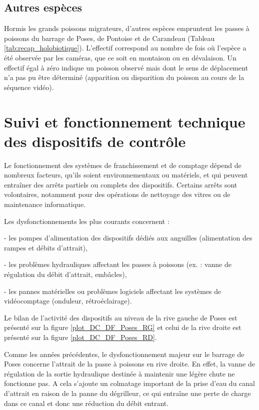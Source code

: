 \documentclass[11pt,twoside]{article}\usepackage[]{graphicx}\usepackage[table]{xcolor}
\begin{document}
\clearpage

\subsection{Autres espèces}



Hormis les grands poissons migrateurs, d'autres espèces empruntent les passes à poissons du barrage de Poses, de Pontoise et de Carandeau (Tableau \ref{tab:recap_holobiotique}). L'effectif correspond au nombre de fois où l'espèce a été observée par les caméras, que ce soit en montaison ou en dévalaison. Un effectif égal à zéro indique un poisson observé mais dont le sens de déplacement n’a pas pu être déterminé (apparition ou disparition du poisson au cours de la séquence vidéo).



\clearpage

\section{Suivi et fonctionnement technique des dispositifs de contrôle}



Le fonctionnement des systèmes de franchissement et de comptage dépend de nombreux facteurs, qu’ils soient environnementaux ou matériels, et qui peuvent entraîner des arrêts partiels ou complets des dispositifs. Certains arrêts sont volontaires, notamment pour des opérations de nettoyage des vitres ou de maintenance informatique.

Les dysfonctionnements les plus courants concernent :

- les pompes d’alimentation des dispositifs dédiés aux anguilles (alimentation des rampes et débits d’attrait),

- les problèmes hydrauliques affectant les passes à poissons (ex. : vanne de régulation du débit d’attrait, embâcles),

- les pannes matérielles ou problèmes logiciels affectant les systèmes de vidéocomptage (onduleur, rétroéclairage).

Le bilan de l'activité des dispositifs au niveau de la rive gauche de Poses est présenté sur la figure \ref{plot_DC_DF_Poses_RG} et celui de la rive droite est présenté sur la figure \ref{plot_DC_DF_Poses_RD}.

Comme les années précédentes, le dysfonctionnement majeur sur le barrage de Poses concerne l'attrait de la passe à poissons en rive droite.
En effet, la vanne de régulation de la sortie hydraulique destinée à maintenir une légère chute ne fonctionne pas. A cela s'ajoute un colmatage important de la prise d'eau du canal d'attrait en raison de la panne du dégrilleur, ce qui entraîne une perte de charge dans ce canal et donc une réduction du débit entrant.
\end{document}
